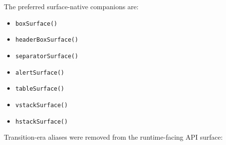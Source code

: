 The preferred surface-native companions are:

\begin{itemize}
\tightlist
\item
  \texttt{b\allowbreak{}o\allowbreak{}x\allowbreak{}S\allowbreak{}u\allowbreak{}r\allowbreak{}f\allowbreak{}a\allowbreak{}c\allowbreak{}e\allowbreak{}(\allowbreak{})}
\item
  \texttt{h\allowbreak{}e\allowbreak{}a\allowbreak{}d\allowbreak{}e\allowbreak{}r\allowbreak{}B\allowbreak{}o\allowbreak{}x\allowbreak{}S\allowbreak{}u\allowbreak{}r\allowbreak{}f\allowbreak{}a\allowbreak{}c\allowbreak{}e\allowbreak{}(\allowbreak{})}
\item
  \texttt{s\allowbreak{}e\allowbreak{}p\allowbreak{}a\allowbreak{}r\allowbreak{}a\allowbreak{}t\allowbreak{}o\allowbreak{}r\allowbreak{}S\allowbreak{}u\allowbreak{}r\allowbreak{}f\allowbreak{}a\allowbreak{}c\allowbreak{}e\allowbreak{}(\allowbreak{})}
\item
  \texttt{a\allowbreak{}l\allowbreak{}e\allowbreak{}r\allowbreak{}t\allowbreak{}S\allowbreak{}u\allowbreak{}r\allowbreak{}f\allowbreak{}a\allowbreak{}c\allowbreak{}e\allowbreak{}(\allowbreak{})}
\item
  \texttt{t\allowbreak{}a\allowbreak{}b\allowbreak{}l\allowbreak{}e\allowbreak{}S\allowbreak{}u\allowbreak{}r\allowbreak{}f\allowbreak{}a\allowbreak{}c\allowbreak{}e\allowbreak{}(\allowbreak{})}
\item
  \texttt{v\allowbreak{}s\allowbreak{}t\allowbreak{}a\allowbreak{}c\allowbreak{}k\allowbreak{}S\allowbreak{}u\allowbreak{}r\allowbreak{}f\allowbreak{}a\allowbreak{}c\allowbreak{}e\allowbreak{}(\allowbreak{})}
\item
  \texttt{h\allowbreak{}s\allowbreak{}t\allowbreak{}a\allowbreak{}c\allowbreak{}k\allowbreak{}S\allowbreak{}u\allowbreak{}r\allowbreak{}f\allowbreak{}a\allowbreak{}c\allowbreak{}e\allowbreak{}(\allowbreak{})}
\end{itemize}

Transition-era aliases were removed from the runtime-facing API surface:

